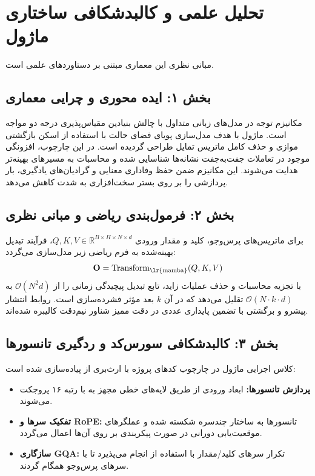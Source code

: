 \section{تحلیل علمی و کالبدشکافی ساختاری ماژول }

مبانی نظری این معماری مبتنی بر دستاوردهای علمی \cite{gu2023mamba} است.
\label{sec:mamba}

\subsection*{بخش ۱: ایده محوری و چرایی معماری }
مکانیزم توجه در مدل‌های زبانی متداول با چالش بنیادین مقیاس‌پذیری درجه دو مواجه است. ماژول  با هدف مدل‌سازی پویای فضای حالت با استفاده از اسکن بازگشتی موازی و حذف کامل ماتریس تمایل طراحی گردیده است. در این چارچوب، افزونگی موجود در تعاملات جفت‌به‌جفت نشانه‌ها شناسایی شده و محاسبات به مسیرهای بهینه‌تر هدایت می‌شوند. این مکانیزم ضمن حفظ وفاداری معنایی و گرادیان‌های یادگیری، بار پردازشی را بر روی بستر سخت‌افزاری به شدت کاهش می‌دهد.

\subsection*{بخش ۲: فرمول‌بندی ریاضی و مبانی نظری }
برای ماتریس‌های پرس‌وجو، کلید و مقدار ورودی $Q, K, V \in \mathbb{R}^{B \times H \times N \times d}$، فرآیند تبدیل بهینه‌شده به فرم ریاضی زیر مدل‌سازی می‌گردد:
\begin{equation}
\mathbf{O} = \operatorname{Transform}_{\text{\lr{mamba}}}(Q, K, V)
\end{equation}
با تجزیه محاسبات و حذف عملیات زاید، تابع تبدیل پیچیدگی زمانی را از $\mathcal{O}(N^2 d)$ به $\mathcal{O}(N \cdot k \cdot d)$ تقلیل می‌دهد که در آن $k$ بعد مؤثر فشرده‌سازی است. روابط انتشار پیشرو و برگشتی با تضمین پایداری عددی در دقت ممیز شناور نیم‌دقت  کالیبره شده‌اند.

\subsection*{بخش ۳: کالبدشکافی سورس‌کد و ردگیری تانسورها }
کلاس اجرایی ماژول در چارچوب کدهای پروژه با ارث‌بری از  پیاده‌سازی شده است:
\begin{itemize}
    \item \textbf{پردازش تانسورها:} ابعاد ورودی \lr{$[B, N, D]$} از طریق لایه‌های خطی مجهز به  با رتبه ۱۶ پروجکت می‌شوند.
    \item \textbf{تفکیک سرها و RoPE:} تانسورها به ساختار چندسره \lr{$[B, H, N, d]$} شکسته شده و عملگرهای موقعیت‌یابی دورانی در صورت پیکربندی بر روی آن‌ها اعمال می‌گردد.
    \item \textbf{سازگاری GQA:} تکرار سرهای کلید/مقدار با استفاده از  انجام می‌پذیرد تا با سرهای پرس‌وجو همگام گردند.
\end{itemize}

